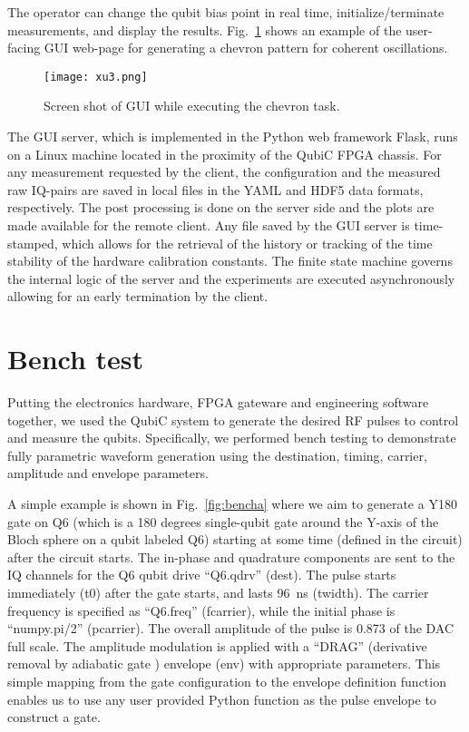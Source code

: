 \documentclass{ieeetran}
\begin{document}
The operator can change the qubit bias point in real time, initialize/terminate measurements, and display the results. 
Fig.~\ref{fig:GUI} shows an example of the user-facing GUI web-page for generating a chevron pattern for coherent oscillations. 

\begin{figure}[!ht]
\centering
\texttt{[image: xu3.png]} 
\caption{Screen shot of GUI while executing the chevron task.}
\label{fig:GUI}
\end{figure}

The GUI server, which is implemented in the Python web framework Flask, runs on a Linux machine located in the proximity of the QubiC FPGA chassis. 
For any measurement requested by the client, the configuration and the measured raw IQ-pairs are saved in local files in the YAML and HDF5 data formats, respectively.
The post processing is done on the server side and the plots are made available for the remote client. 
Any file saved by the GUI server is time-stamped, which allows for the retrieval of the history or tracking of the time stability of the hardware calibration constants.
The finite state machine governs the internal logic of the server and the experiments are executed asynchronously allowing for an early termination by the client.

\section{Bench test}
Putting the electronics hardware, FPGA gateware and engineering software together, we used the QubiC system to generate the desired RF pulses to control and measure the qubits.
Specifically, we performed bench testing to demonstrate fully parametric waveform generation using the destination, timing, carrier, amplitude and envelope parameters.

A simple example is shown in Fig.~\ref{fig:bencha} where we aim to generate a Y180 gate on Q6 (which is a 180 degrees single-qubit gate around the Y-axis of the Bloch sphere on a qubit labeled Q6) starting at some time (defined in the circuit) after the circuit starts.
The in-phase and quadrature components are sent to the IQ channels for the Q6 qubit drive ``Q6.qdrv'' (dest).
The pulse starts immediately (t0) after the gate starts, and lasts 96~ns (twidth).
The carrier frequency is specified as ``Q6.freq'' (fcarrier), while the initial phase is ``numpy.pi/2'' (pcarrier).
The overall amplitude of the pulse is 0.873 of the DAC full scale.
The amplitude modulation is applied with a ``DRAG'' (derivative removal by adiabatic gate \cite{motzoi2009simple}) envelope (env) with appropriate parameters.
This simple mapping from the gate configuration to the envelope definition function enables us to use any user provided Python function as the pulse envelope to construct a gate.
\end{document}
